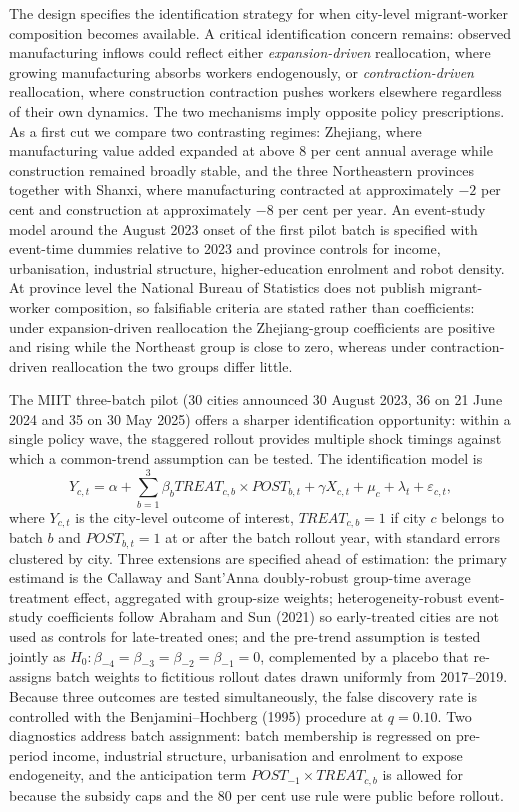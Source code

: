 \documentclass[12pt]{article}
\begin{document}
The design specifies the identification strategy for when city-level migrant-worker composition becomes available. A critical identification concern remains: observed manufacturing inflows could reflect either \emph{expansion-driven} reallocation, where growing manufacturing absorbs workers endogenously, or \emph{contraction-driven} reallocation, where construction contraction pushes workers elsewhere regardless of their own dynamics. The two mechanisms imply opposite policy prescriptions. As a first cut we compare two contrasting regimes: Zhejiang, where manufacturing value added expanded at above 8 per cent annual average while construction remained broadly stable, and the three Northeastern provinces together with Shanxi, where manufacturing contracted at approximately $-2$ per cent and construction at approximately $-8$ per cent per year. An event-study model around the August 2023 onset of the first pilot batch is specified with event-time dummies relative to 2023 and province controls for income, urbanisation, industrial structure, higher-education enrolment and robot density. At province level the National Bureau of Statistics does not publish migrant-worker composition, so falsifiable criteria are stated rather than coefficients: under expansion-driven reallocation the Zhejiang-group coefficients are positive and rising while the Northeast group is close to zero, whereas under contraction-driven reallocation the two groups differ little.

The MIIT three-batch pilot (30 cities announced 30 August 2023, 36 on 21 June 2024 and 35 on 30 May 2025) offers a sharper identification opportunity: within a single policy wave, the staggered rollout provides multiple shock timings against which a common-trend assumption can be tested. The identification model is
\[
Y_{c,t} = \alpha + \sum_{b=1}^{3} \beta_b TREAT_{c,b} \times POST_{b,t} + \gamma X_{c,t} + \mu_c + \lambda_t + \varepsilon_{c,t},
\]
where $Y_{c,t}$ is the city-level outcome of interest, $TREAT_{c,b}=1$ if city $c$ belongs to batch $b$ and $POST_{b,t}=1$ at or after the batch rollout year, with standard errors clustered by city. Three extensions are specified ahead of estimation: the primary estimand is the Callaway and Sant'Anna doubly-robust group-time average treatment effect, aggregated with group-size weights; heterogeneity-robust event-study coefficients follow Abraham and Sun (2021) so early-treated cities are not used as controls for late-treated ones; and the pre-trend assumption is tested jointly as $H_0:\beta_{-4}=\beta_{-3}=\beta_{-2}=\beta_{-1}=0$, complemented by a placebo that re-assigns batch weights to fictitious rollout dates drawn uniformly from 2017--2019. Because three outcomes are tested simultaneously, the false discovery rate is controlled with the Benjamini--Hochberg (1995) procedure at $q=0.10$. Two diagnostics address batch assignment: batch membership is regressed on pre-period income, industrial structure, urbanisation and enrolment to expose endogeneity, and the anticipation term $POST_{-1} \times TREAT_{c,b}$ is allowed for because the subsidy caps and the 80 per cent use rule were public before rollout.
\end{document}
